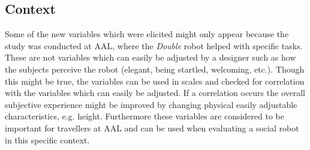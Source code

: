 \subsection{Context}
 Some of the new variables which were elicited might only appear because the study was conducted at AAL, where the \textit{Double} robot helped with specific tasks. These are not variables which can easily be adjusted by a designer such as how the subjects perceive the robot (elegant, being startled, welcoming, etc.). Though this might be true, the variables can be used in scales and checked for correlation with the variables which can easily be adjusted. If a correlation occurs the overall subjective experience might be improved by changing physical easily adjustable characteristics, e.g. height. Furthermore these variables are considered to be important for travellers at AAL and can be used when evaluating a social robot in this specific context.  